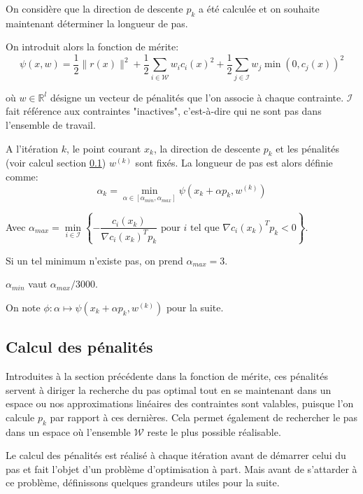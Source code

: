 \documentclass[a4paper,11pt]{article}
\newcommand{\real}{\mathbb{R}}
\numberwithin{equation}{section}
\begin{document}
On considère que la direction de descente $p_{k}$ a été calculée et on souhaite maintenant déterminer la longueur de pas. 

On introduit alors la fonction de mérite: 
\begin{equation} \label{meritfunction}
\psi(x,w) = \dfrac{1}{2}\|r(x)\|^2 +  \dfrac{1}{2}\sum_{i \in \mathcal{W}} w_ic_i(x)^2 + \dfrac{1}{2} \sum_{j \in \mathcal{I}} w_j\min(0,c_j(x))^2
\end{equation}

où $w \in \real^{l}$ désigne un vecteur de pénalités que l'on associe à chaque contrainte. $\mathcal{I}$ fait référence aux contraintes "inactives", c'est-à-dire qui ne sont pas dans l'ensemble de travail.

A l'itération $k$, le point courant $x_{k}$, la direction de descente $p_{k}$ et les pénalités (voir calcul section \ref{calcul poids}) $w^{(k)}$ sont fixés. La longueur de pas est alors définie comme:
\begin{equation}
\alpha_{k} = \underset{\alpha \in [\alpha_{min},\alpha_{max}]}{\min} \psi(x_{k}+\alpha p_{k},w^{(k)})
\end{equation}

Avec $\alpha_{max} = \underset{i \in \mathcal{I}}{\min}\left\{-\dfrac{c_i(x_{k})}{\nabla c_i(x_{k})^Tp_{k}} \text{ pour }i \text{ tel que } \nabla c_i(x_{k})^Tp_{k} < 0 \right\}$. 

Si un tel minimum n'existe pas, on prend $\alpha_{max} = 3$. 

$\alpha_{min}$ vaut $\alpha_{max} / 3000$.

On note $\phi: \alpha \mapsto \psi(x_{k}+\alpha p_{k},w^{(k)})$ pour la suite.

\subsection{Calcul des pénalités} \label{calcul poids}

Introduites à la section précédente dans la fonction de mérite, ces pénalités servent à diriger la recherche du pas optimal tout en se maintenant dans un espace ou nos approximations linéaires des contraintes sont valables, puisque l'on calcule $p_{k}$ par rapport à ces dernières. Cela permet également de rechercher le pas dans un espace où l'ensemble $\mathcal{W}$ reste le plus possible réalisable. 

Le calcul des pénalités est réalisé à chaque itération avant de démarrer celui du pas et fait l'objet d'un problème d'optimisation à part. Mais avant de s'attarder à ce problème, définissons quelques grandeurs utiles pour la suite.
\end{document}
